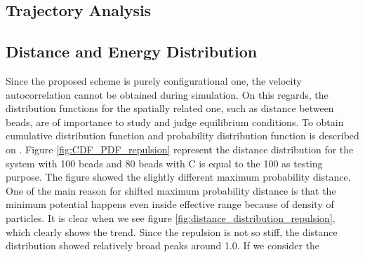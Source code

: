 \documentclass[10pt, a4paper]{report}
\begin{document}
\subsection{Trajectory Analysis}

\subsection{Distance and Energy Distribution}
Since the proposed scheme is purely configurational one, the velocity autocorrelation cannot be obtained during simulation. On this regards, the distribution functions for the spatially related one, such as distance between beads, are of importance to study and judge equilibrium conditions. To obtain cumulative distribution function and probability distribution function is described on \label{appen_distance_distribution}.
Figure \ref{fig:CDF_PDF_repulsion} represent the distance distribution for the system with 100 beads and 80 beads with C is equal to the 100 as testing purpose.
The figure showed the slightly different maximum probability distance. One of the main reason for shifted maximum probability distance is that the minimum potential happens even inside effective range because of density of particles. It is clear when we see figure \ref{fig:distance_distribution_repulsion}, which clearly shows the trend.
Since the repulsion is not so stiff, the distance distribution showed relatively broad peaks around 1.0. If we consider the 
\end{document}

